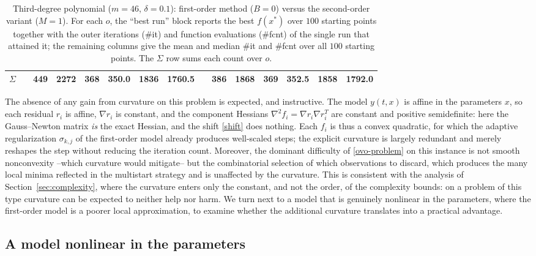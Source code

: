 \documentclass[11pt]{article}
\begin{document}
\begin{table}[ht!]
{\begin{tabular}{c ccc cc cc ccc cc cc}
\hline
$\Sigma$ & & 449 & 2272 & 368 & 350.0 & 1836 & 1760.5 & & 386 & 1868 & 369 & 352.5 & 1858 & 1792.0 \\
\hline
\end{tabular}%
}
\caption{Third-degree polynomial ($m=46$, $\delta=0.1$): first-order method
($B=0$) versus the second-order variant ($M=1$). For each $o$, the ``best run''
block reports the best $f(x^*)$ over $100$ starting points together with the
outer iterations (\#it) and function evaluations (\#fcnt) of the single run that
attained it; the remaining columns give the mean and median \#it and \#fcnt over
all $100$ starting points. The $\Sigma$ row sums each count over $o$.}
\label{tab:poly}
\end{table}

The absence of any gain from curvature on this problem is expected, and
instructive. The model $y(t,x)$ is affine in the parameters $x$, so each
residual $r_i$ is affine, $\nabla r_i$ is constant, and the component Hessians
$\nabla^2 f_i=\nabla r_i\nabla r_i^T$ are constant and positive semidefinite:
here the Gauss--Newton matrix \emph{is} the exact Hessian, and the shift
\eqref{shift} does nothing. Each $f_i$ is thus a convex
quadratic, for which the adaptive regularization $\sigma_{k,j}$ of the
first-order model already produces well-scaled steps; the explicit curvature is
largely redundant and merely reshapes the step without reducing the iteration
count. Moreover, the dominant difficulty of \eqref{ovo-problem} on this
instance is not smooth nonconvexity --which curvature would mitigate-- but the
combinatorial selection of which observations to discard, which produces the
many local minima reflected in the multistart strategy and is unaffected by
the curvature. This is consistent with the analysis of Section~\ref{sec:complexity},
where the curvature enters only the constant, and not the order, of the complexity
bounds: on a problem of this type curvature can be expected to neither help nor
harm. We turn next to a model that is genuinely nonlinear in the parameters, where
the first-order model is a poorer local approximation, to examine whether the
additional curvature translates into a practical advantage.

\subsection{A model nonlinear in the parameters} \label{subsec:bard}
\end{document}
